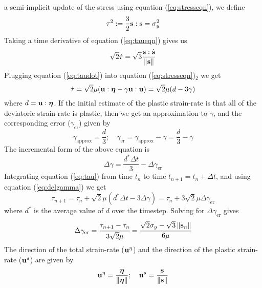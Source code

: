   a semi-implicit update of the stress using equation (\ref{eq:stresseqn}), we
  define
  \begin{equation}\label{eq:taueqn}
    \tau^2 := \frac{3}{2} \mathbf{s}:\mathbf{s} = \sigma_y^2
  \end{equation}
  Taking a time derivative of equation (\ref{eq:taueqn}) gives us
  \begin{equation}\label{eq:taudot}
    \sqrt{2} \dot{\tau} = \sqrt{3} \frac{\mathbf{s}:\dot{\mathbf{s}}}{\left\lVert\mathbf{s}\right\rVert}
  \end{equation}
  Plugging equation (\ref{eq:taudot}) into equation (\ref{eq:stresseqn})$_2$
  we get
  \begin{equation}\label{eq:tau}
    \dot{\tau} = \sqrt{2}\mu(\mathbf{u}:\boldsymbol{\eta} - \gamma\mathbf{u}:\mathbf{u})
               = \sqrt{2} \mu (d - 3\gamma)
  \end{equation} 
  where $d = \mathbf{u}:\boldsymbol{\eta}$.  If the initial estimate of the plastic strain-rate
  is that all of the deviatoric strain-rate is plastic, then we get an 
  approximation to $\gamma$, and the corresponding error 
  ($\gamma_{\text{er}}$) given by
  \begin{equation}\label{eq:gammaer}
    \gamma_{\text{approx}} = \frac{d}{3}; \quad
    \gamma_{\text{er}} = \gamma_{\text{approx}} - \gamma = \frac{d}{3} - \gamma
  \end{equation}
  The incremental form of the above equation is
  \begin{equation}\label{eq:delgamma}
    \Delta\gamma = \frac{d^*\Delta t}{3} - \Delta\gamma_{\text{er}}
  \end{equation}
  Integrating equation (\ref{eq:tau}) from time $t_n$ to time $t_{n+1} = 
  t_n + \Delta t$, and using equation (\ref{eq:delgamma}) we get
  \begin{equation}\label{eq:taun}
    \tau_{n+1} = \tau_n + \sqrt{2}\mu(d^*\Delta t - 3\Delta\gamma)
               = \tau_n + 3\sqrt{2}\mu\Delta\gamma_{\text{er}}
  \end{equation}
  where $d^*$ is the average value of $d$ over the timestep.
  Solving for $\Delta\gamma_{\text{er}}$ gives
  \begin{equation}\label{eq:delgammaer}
    \Delta\gamma_{\text{er}} = \cfrac{\tau_{n+1} - \tau_n}{3\sqrt{2}\mu}
      = \cfrac{\sqrt{2}\sigma_y - \sqrt{3}\left\lVert\mathbf{s}_n\right\rVert}{6\mu}
  \end{equation}
  The direction of the total strain-rate ($\mathbf{u}^{\eta}$) and the
  direction of the plastic strain-rate ($\mathbf{u}^s$) are given by 
  \begin{equation}
    \mathbf{u}^{\eta} = \frac{\boldsymbol{\eta}}{\left\lVert\boldsymbol{\eta}\right\rVert} ; \quad
    \mathbf{u}^{s} = \frac{\mathbf{s}}{\left\lVert\mathbf{s}\right\rVert} 
  \end{equation}
